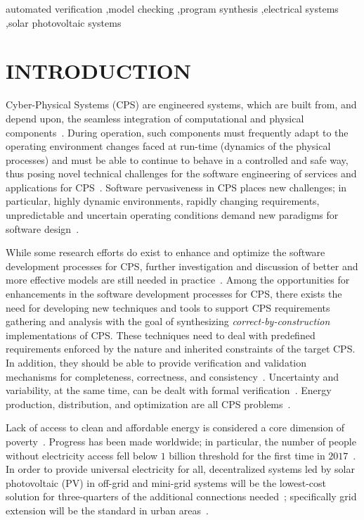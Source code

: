 \documentclass[review]{elsarticle}
\begin{document}
\begin{frontmatter}
\begin{keyword}
automated verification \sep model checking \sep program synthesis \sep electrical systems \sep solar photovoltaic systems
\end{keyword}

\end{frontmatter}


\section{INTRODUCTION}
Cyber-Physical Systems (CPS) are engineered systems, which are built from, and depend upon, the seamless integration of computational and physical  components~\cite{NSF2015}. During operation, such components must frequently adapt to the operating environment changes faced at run-time (dynamics of the physical processes) and must be able to continue to behave in a controlled and safe way, thus posing novel technical challenges for the software engineering of services and applications for CPS~\cite{Metzger2014}. Software pervasiveness in CPS places new challenges; in particular, highly dynamic environments, rapidly changing requirements, unpredictable and uncertain operating conditions demand new paradigms for software design~\cite{Filieri2015}.

While some research efforts do exist to enhance and optimize the software development processes for CPS, further investigation and discussion of better and more effective models are still needed in practice~\cite{Al-Jaroodi2016}. Among the opportunities for enhancements in the software development processes for CPS, there exists the need for developing new techniques and tools to support CPS requirements gathering and analysis with the goal of synthesizing \textit{correct-by-construction} implementations of CPS. These techniques need to deal with predefined requirements enforced by the nature and inherited constraints of the target CPS. In addition, they should be able to provide verification and validation mechanisms for completeness, correctness, and consistency~\cite{Al-Jaroodi2016}. Uncertainty and variability, at the same time, can be dealt with formal verification~\cite{NESSI}. Energy production, distribution, and optimization are all CPS problems~\cite{UC}. 

Lack of access to clean and affordable energy is considered a core dimension of poverty~\cite{Hussein2012}. Progress has been made worldwide; in particular, the number of people without electricity access fell below $1$ billion threshold for the first time in $2017$~\cite{IEAweo2018}. In order to provide universal electricity for all, decentralized systems led by solar photovoltaic (PV) in off-grid and mini-grid systems will be the lowest-cost solution for three-quarters of the additional connections needed~\cite{Hussein2012}; specifically grid extension will be the standard in urban areas~\cite{IEAweo2018}.
\end{document}
